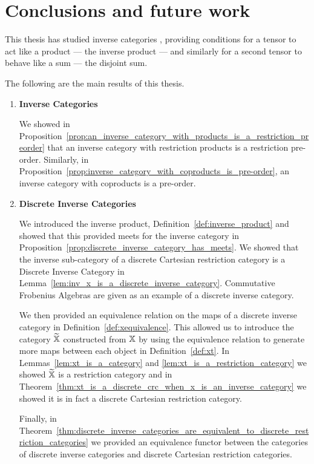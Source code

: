\chapter{Conclusions and future work} %
\label{cha:conclusions_and_future_work}

This thesis has studied inverse categories \cite{cockett2002:restcategories1}, providing conditions
for a tensor to act like a product --- the inverse product --- and similarly for a second
tensor to behave like a sum --- the disjoint sum.

The following are the main results of this thesis.

\begin{enumerate}
\item \textbf{Inverse Categories}

We showed in Proposition~\ref{prop:an_inverse_category_with_products_is_a_restriction_preorder} that
an inverse category with restriction products is a restriction pre-order. Similarly, in
Proposition~\ref{prop:inverse_category_with_coproducts_is_pre-order}, an inverse category with
coproducts is a pre-order.

\item \textbf{Discrete Inverse Categories}

We introduced the inverse product, Definition~\ref{def:inverse_product} and showed that this
provided meets for the inverse category in
Proposition~\ref{prop:discrete_inverse_category_has_meets}. We showed that the inverse sub-category
of a discrete Cartesian restriction category is a Discrete Inverse Category in
Lemma~\ref{lem:inv_x_is_a_discrete_inverse_category}. Commutative Frobenius Algebras are given as an
example of a discrete inverse category.

We then provided an equivalence relation on the maps of a discrete inverse category \X in
Definition~\ref{def:xequivalence}. This allowed us to introduce the category $\widetilde{\mathbb{X}}$ constructed from
$\mathbb{X}$ by using the equivalence relation to generate more maps between each object in
Definition~\ref{def:xt}. In Lemmas~\ref{lem:xt_is_a_category} and
\ref{lem:xt_is_a_restriction_category} we showed $\widetilde{\mathbb{X}}$ is a restriction category and in
Theorem~\ref{thm:xt_is_a_discrete_crc_when_x_is_an_inverse_category} we showed it is in fact a
discrete Cartesian restriction category.

Finally, in
Theorem~\ref{thm:discrete_inverse_categories_are_equivalent_to_discrete_restriction_categories} we
provided an equivalence functor between the categories of discrete inverse categories and discrete
Cartesian restriction categories.


\end{enumerate}
